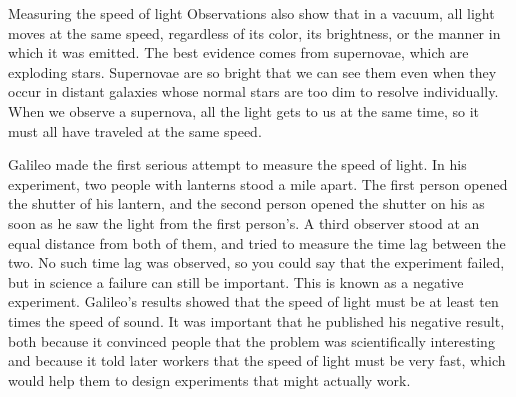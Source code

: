 \begin{envsubsection}{Measuring the speed of light}
Observations also show that in a vacuum, all light moves at the same speed,
regardless of its color, its brightness, or the manner in which it was emitted.
The best evidence comes from supernovae, which are exploding stars. Supernovae
are so bright that we can see them even when they occur in distant galaxies whose
normal stars are too dim to resolve individually. When we observe a supernova,
all the light gets to us at the same time, so it must all have traveled at the
same speed.

Galileo made the first serious attempt to measure the speed of light. In his
experiment, two people with lanterns stood a mile apart. The first person
opened the shutter of his lantern, and the second person opened the shutter
on his as soon as he saw the light from the first person's. A third observer
stood at an equal distance from both of them, and tried to measure the time
lag between the two. No such time lag was observed, so you could say that the
experiment failed, but in science a failure can still be important. This is
known as a negative experiment. Galileo's results showed that the speed of
light must be at least ten times the speed of sound. It was important that he
published his negative result, both because it convinced people that the problem
was scientifically interesting and because it told later workers that the
speed of light must be very fast, which would help them to design experiments
that might actually work.


\end{envsubsection}
